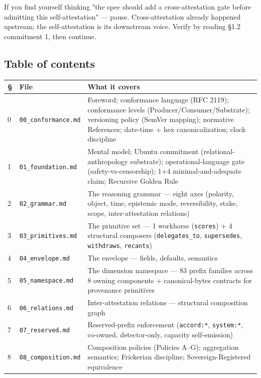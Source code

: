 \documentclass[11pt]{article}
\begin{document}
If you find yourself thinking "the spec should add a cross-attestation gate before admitting this self-attestation" — pause. Cross-attestation already happened upstream; the self-attestation is its downstream voice. Verify by reading §1.2 commitment 1, then continue.



\subsection*{Table of contents}


{\footnotesize
\begin{longtable}{|p{5.33cm}|p{5.33cm}|p{5.33cm}|}\hline
\textbf{§} & \textbf{File} & \textbf{What it covers} \\ \hline\endhead
0 & \texttt{00\_conformance.md} & Foreword; conformance language (RFC 2119); conformance levels (Producer/Consumer/Substrate); versioning policy (SemVer mapping); normative References; date-time + hex canonicalization; clock discipline \\ \hline
1 & \texttt{01\_foundation.md} & Mental model; Ubuntu commitment (relational-anthropology substrate); operational-language gate (safety-vs-censorship); 1+4 minimal-and-adequate claim; Recursive Golden Rule \\ \hline
2 & \texttt{02\_grammar.md} & The reasoning grammar — eight axes (polarity, object, time, epistemic mode, reversibility, stake, scope, inter-attestation relations) \\ \hline
3 & \texttt{03\_primitives.md} & The primitive set — 1 workhorse (\texttt{scores}) + 4 structural composers (\texttt{delegates\_to}, \texttt{supersedes}, \texttt{withdraws}, \texttt{recants}) \\ \hline
4 & \texttt{04\_envelope.md} & The envelope — fields, defaults, semantics \\ \hline
5 & \texttt{05\_namespace.md} & The dimension namespace — 83 prefix families across 8 owning components + canonical-bytes contracts for provenance primitives \\ \hline
6 & \texttt{06\_relations.md} & Inter-attestation relations — structural composition graph \\ \hline
7 & \texttt{07\_reserved.md} & Reserved-prefix enforcement (\texttt{accord:*}, \texttt{system:*}, co-owned, detector-only, capacity self-emission) \\ \hline
8 & \texttt{08\_composition.md} & Composition policies (Policies A–G); aggregation semantics; Frickerian discipline; Sovereign-Registered equivalence \\ \hline

\end{longtable}}
\end{document}
